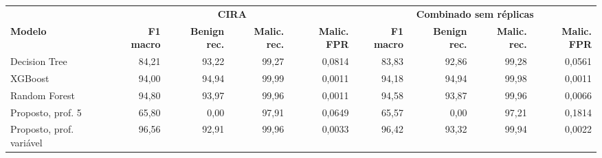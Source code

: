 \begin{tabular}{lrrrrrrrr}
\hline
\multicolumn{1}{c}{\textbf{}} & \multicolumn{4}{c}{\textbf{CIRA}} & \multicolumn{4}{c}{\textbf{Combinado sem réplicas}} \\
\textbf{Modelo} & \textbf{F1 macro} & \textbf{Benign rec.} & \textbf{Malic. rec.} & \textbf{Malic. FPR} & \textbf{F1 macro} & \textbf{Benign rec.} & \textbf{Malic. rec.} & \textbf{Malic. FPR} \\ \hline
Decision Tree & 84,21 & 93,22 & 99,27 & 0,0814 & 83,83 & 92,86 & 99,28 & 0,0561 \\
XGBoost & 94,00 & 94,94 & 99,99 & 0,0011 & 94,18 & 94,94 & 99,98 & 0,0011 \\
Random Forest & 94,80 & 93,97 & 99,96 & 0,0011 & 94,58 & 93,87 & 99,96 & 0,0066 \\
Proposto, prof. 5 & 65,80 & 0,00 & 97,91 & 0,0649 & 65,57 & 0,00 & 97,21 & 0,1814 \\
Proposto, prof. variável & 96,56 & 92,91 & 99,96 & 0,0033 & 96,42 & 93,32 & 99,94 & 0,0022 \\
\hline
\end{tabular}
